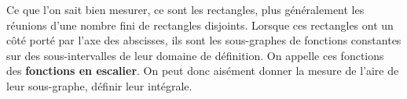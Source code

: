\bigskip


 Ce que l'on sait bien mesurer, ce sont les rectangles, plus généralement les réunions d'une nombre fini de rectangles disjoints. Lorsque ces rectangles ont un côté porté par l'axe des abscisses, ils sont les sous-graphes de fonctions constantes sur des sous-intervalles de leur domaine de définition. On appelle ces fonctions des \textbf{fonctions en escalier}. On peut donc aisément donner la mesure de l'aire de leur sous-graphe, \ie définir leur intégrale.

\bigskip

